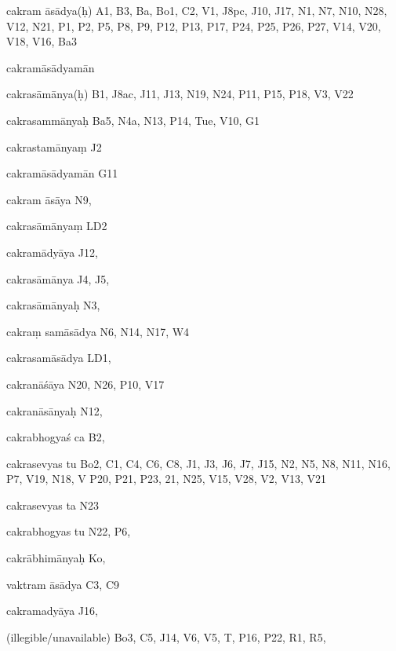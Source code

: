 \begin{marma}[hp02_009]
\begin{marma}[hp02_011]
\begin{marma}[hp02_54a]
\begin{description}
    \end{description}
 \end{marma}


 \begin{marma}[hp02_55a]
\item[cakram āsādya(ḥ)] A1, B3, Ba, Bo1, C2, V1, J8pc, J10, J17, N1, N7, N10, N28, V12,
 N21, P1, P2, P5, P8, P9, P12, P13, P17, P24, P25, P26, P27, V14, V20, V18, V16, Ba3
\item[cakramāsādyamān] 
\item[cakrasāmānya(ḥ)] B1, J8ac, J11, J13, N19, N24, P11, P15, P18, V3, V22
\item[cakrasammānyaḥ] Ba5, N4a, N13, P14, Tue, V10, G1
\item[cakrastamānyaṃ] J2
\item[cakramāsādyamān] G11
\item[cakram āsāya] N9,
\item[cakrasāmānyaṃ] LD2
\item[cakramādyāya] J12,
\item[cakrasāmānya] J4, J5,
\item[cakrasāmānyaḥ] N3, 
\item[cakraṃ samāsādya] N6, N14, N17, W4
\item[cakrasamāsādya] LD1,
\item[cakranāśāya] N20, N26, P10, V17
\item[cakranāsānyaḥ] N12, 
\item[cakrabhogyaś ca] B2,
\item[cakrasevyas tu] Bo2, C1, C4, C6, C8, J1, J3, J6, J7, J15, N2, N5, N8, N11, N16, P7, V19, N18, V P20, P21, P23, 21, N25, V15, V28, V2, V13, V21
\item[cakrasevyas ta] N23
\item[cakrabhogyas tu] N22, P6, 
\item[cakrābhimānyaḥ] Ko,
\item[vaktram āsādya] C3, C9
\item[cakramadyāya] J16,
\item[(illegible/unavailable)] Bo3, C5, J14, V6, V5, T, P16, P22, R1, R5,
  \begin{description}

    \end{description}
 \end{marma}



\end{marma}
\end{marma}
